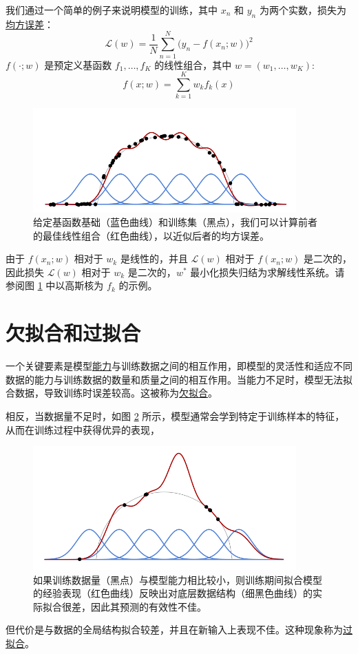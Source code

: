 我们通过一个简单的例子来说明模型的训练，其中 $x_n$ 和 $y_n$ 为两个实数，损失为\underline{均方误差}：
\begin{equation}
    \mathcal{L}(w) = \frac{1}{N}\sum_{n=1}^{N}\big(y_n-f(x_n;w)\big)^2
\end{equation}
$f(\cdot;w)$ 是预定义基函数 $f_1, \dots , f_K$ 的线性组合，其中 $w =(w_1, \dots ,w_K)$:
\[f(x;w) = \sum_{k=1}^{K}w_kf_k(x)\]
\begin{figure}
    \centering
    \includegraphics[width=0.9\textwidth]{fig/fig1.1.png}
    \caption[核回归]{给定基函数基础（蓝色曲线）和训练集（黑点），我们可以计算前者的最佳线性组合（红色曲线），以近似后者的均方误差。}
    \label{fig1.1}
\end{figure}
由于 $f(x_n;w)$ 相对于 $w_k$ 是线性的，并且 $\mathcal{L}(w)$ 相对于 $f(x_n;w)$ 是二次的，因此损失 $\mathcal{L}(w)$ 相对于 $w_k$ 是二次的，$w^*$ 最小化损失归结为求解线性系统。请参阅图 \ref{fig1.1} 中以高斯核为 $f_k$ 的示例。

\section{欠拟合和过拟合}

一个关键要素是模型\underline{能力}与训练数据之间的相互作用，即模型的灵活性和适应不同数据的能力与训练数据的数量和质量之间的相互作用。当能力不足时，模型无法拟合数据，导致训练时误差较高。这被称为\underline{欠拟合}。

相反，当数据量不足时，如图 \ref{fig1.2} 所示，模型通常会学到特定于训练样本的特征，从而在训练过程中获得优异的表现，
\begin{figure}
    \centering
    \includegraphics[width=0.9\textwidth]{fig/fig1.2.png}
    \caption[核回归的过拟合]{如果训练数据量（黑点）与模型能力相比较小，则训练期间拟合模型的经验表现（红色曲线）反映出对底层数据结构（细黑色曲线）的实际拟合很差，因此其预测的有效性不佳。}
    \label{fig1.2}
\end{figure}
但代价是与数据的全局结构拟合较差，并且在新输入上表现不佳。这种现象称为\underline{过拟合}。

